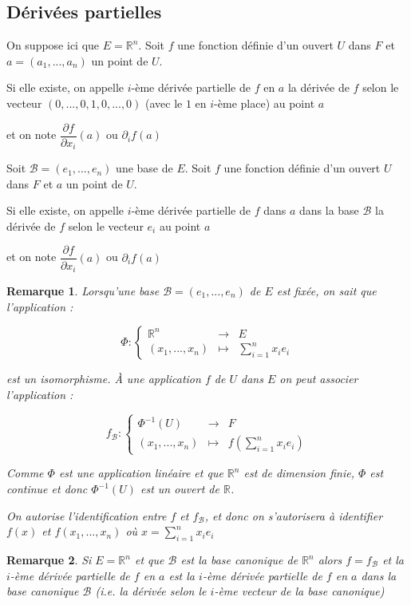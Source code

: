 \documentclass[a4paper,12pt]{book}
\newcommand{\Def}[2]{\begin{tcolorbox}[sharp corners, colback=white,colframe=blue!90!black!75, title=Définition : #1]#2\end{tcolorbox}}
\newtheorem{Rem}{Remarque}[section]
\def\R{\mathbb{R}}
\begin{document}
\subsection{Dérivées partielles}
\Def{}{On suppose ici que $E = \R^n$. Soit $f$ une fonction définie d'un ouvert $U$ dans $F$ et $a=(a_1,..., a_n)$ un point de $U$.
\par Si elle existe, on appelle $i$-ème dérivée partielle de $f$ en $a$ la dérivée de $f$ selon le vecteur $(0,...,0, 1, 0,...,0)$ (avec le $1$ en $i$-ème place) au point $a$
\par et on note $\dfrac{\partial f}{\partial x_i}(a)$ ou $\partial_i f(a)$}
\Def{}{Soit $\mathcal{B}=(e_1,..., e_n)$ une base de $E$. Soit $f$ une fonction définie d'un ouvert $U$ dans $F$ et $a$ un point de $U$.
\par Si elle existe, on appelle $i$-ème dérivée partielle de $f$ dans $a$ dans la base $\mathcal{B}$ la dérivée de $f$ selon le vecteur $e_i$ au point $a$
\par et on note $\dfrac{\partial f}{\partial x_i}(a)$ ou $\partial_if(a)$}
\begin{Rem}
Lorsqu'une base $\mathcal{B}=(e_1,..., e_n)$ de $E$ est fixée, on sait que l'application :
\par $$\Phi:\left\{\begin{array}{rcl}\R^n &\to & E \\ (x_1,..., x_n) & \mapsto & \sum\limits_{i=1}^n x_ie_i\end{array}\right.$$
\par est un isomorphisme. À une application $f$ de $U$ dans $E$ on peut associer l'application :
\par $$f_\mathcal{B} :\left\{\begin{array}{rcl}\Phi^{-1}(U) & \to & F \\ (x_1,..., x_n) & \mapsto & f\left(\sum\limits_{i=1}^nx_ie_i\right)\end{array}\right.$$
\par Comme $\Phi$ est une application linéaire et que $\R^n$ est de dimension finie, $\Phi$ est continue et donc $\Phi^{-1}(U)$ est un ouvert de $\R$.
\par On autorise l'identification entre $f$ et $f_\mathcal{B}$, et donc on s'autorisera à identifier $f(x)$ et $f(x_1,..., x_n)$ où $x= \sum\limits_{i=1}^nx_ie_i$
\end{Rem}
\begin{Rem}
Si $E = \R^n$ et que $\mathcal{B}$ est la base canonique de $\R^n$ alors $f = f_\mathcal{B}$ et la $i$-ème dérivée partielle de $f$ en $a$ est la $i$-ème dérivée partielle de $f$ en $a$ dans la base canonique $\mathcal{B}$ (i.e. la dérivée selon le $i$-ème vecteur de la base canonique)
\end{Rem}
\end{document}

